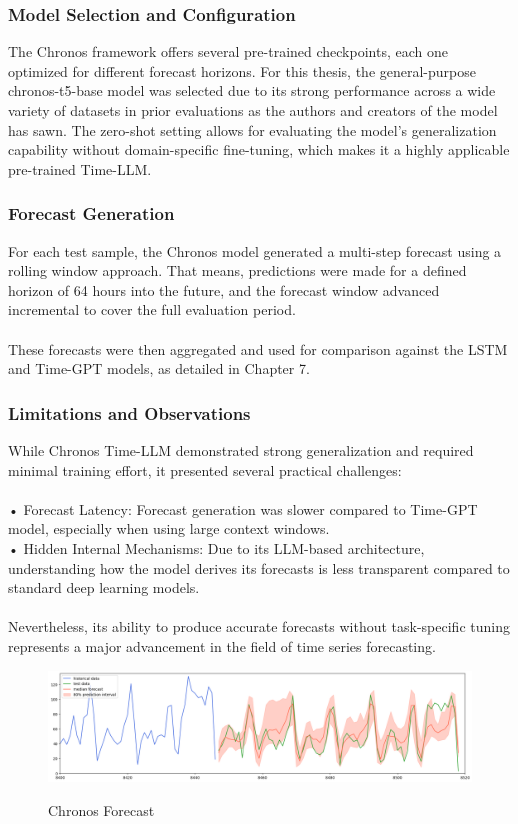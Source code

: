 \documentclass{article}
\begin{document}
\subsubsection{Model Selection and Configuration}
The Chronos framework offers several pre-trained checkpoints, each one optimized for different forecast horizons. For this thesis, the general-purpose chronos-t5-base model was selected due to its strong performance across a wide variety of datasets in prior evaluations as the authors and creators of the model has sawn. The zero-shot setting allows for evaluating the model’s generalization capability without domain-specific fine-tuning, which makes it a highly applicable pre-trained Time-LLM.

\subsubsection{Forecast Generation}
For each test sample, the Chronos model generated a multi-step forecast using a rolling window approach. That means, predictions were made for a defined horizon of 64 hours into the future, and the forecast window advanced incremental to cover the full evaluation period.\\
\\
These forecasts were then aggregated and used for comparison against the LSTM and Time-GPT models, as detailed in Chapter 7.

\subsubsection{Limitations and Observations}
While Chronos Time-LLM demonstrated strong generalization and required minimal training effort, it presented several practical challenges:\\
\\
•	Forecast Latency: Forecast generation was slower compared to Time-GPT model, especially when using large context windows.\\
•	Hidden Internal Mechanisms: Due to its LLM-based architecture, understanding how the model derives its forecasts is less transparent compared to standard deep learning models.\\
\\
Nevertheless, its ability to produce accurate forecasts without task-specific tuning represents a major advancement in the field of time series forecasting.


\begin{figure}[h]
\includegraphics[width=1\linewidth]{images/chronos_forecast.png}
    \label{fig:mesh1}
    \caption{Chronos Forecast}
\end{figure}
\end{document}

